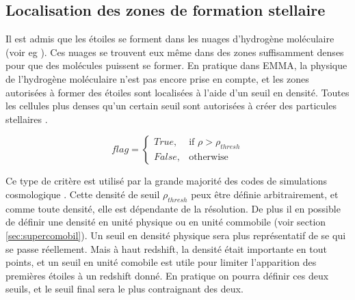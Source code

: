 %




\subsection{Localisation des zones de formation stellaire}

Il est admis que les étoiles se forment dans les nuages d'hydrogène moléculaire (voir eg \cite{krumholz_universal_2012}).
Ces nuages se trouvent eux même dans des zones suffisamment denses pour que des molécules puissent se former.
En pratique dans EMMA, la physique de l'hydrogène moléculaire n'est pas encore prise en compte, et les zones autorisées à former des étoiles sont localisées à l'aide d'un seuil en densité.
Toutes les cellules plus denses qu'un certain seuil sont autorisées à créer des particules stellaires .

\begin{equation}
	flag = 
  \begin{cases}
      True, & \text{if } \rho > \rho_{thresh}\\
      False,              & \text{otherwise}
  \end{cases}
\end{equation} 

Ce type de critère est utilisé par la grande majorité des codes de simulations cosmologique \citep{kay_including_2002}.
Cette densité de seuil $\rho_{thresh}$ peux être définie arbitrairement, et comme toute densité, elle est dépendante de la résolution.
De plus il en possible de définir une densité en unité physique ou en unité commobile (voir section \ref{sec:supercomobil}).
Un seuil en densité physique sera plus représentatif de se qui se passe réellement.
Mais à haut redshift, la densité était importante en tout points, et un seuil en unité comobile est utile pour limiter l'apparition des premières étoiles à un redshift donné.
En pratique on pourra définir ces deux seuils, et le seuil final sera le plus contraignant des deux.

